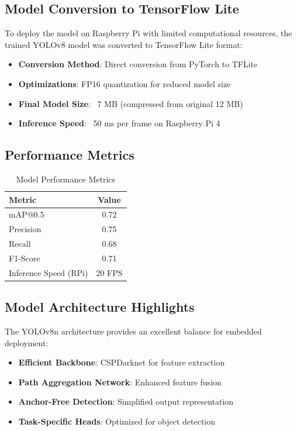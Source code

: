 \documentclass[12pt,a4paper]{article}
\begin{document}
	\subsection{Model Conversion to TensorFlow Lite}
	
	To deploy the model on Raspberry Pi with limited computational resources, the trained YOLOv8 model was converted to TensorFlow Lite format:
	
	\begin{itemize}
		\item \textbf{Conversion Method}: Direct conversion from PyTorch to TFLite
		\item \textbf{Optimizations}: FP16 quantization for reduced model size
		\item \textbf{Final Model Size}: ~7 MB (compressed from original 12 MB)
		\item \textbf{Inference Speed}: ~50 ms per frame on Raspberry Pi 4
	\end{itemize}
	
	\subsection{Performance Metrics}
	
	\begin{table}[H]
		\centering
		\begin{tabular}{|l|c|}
			\hline
			\textbf{Metric} & \textbf{Value} \\
			\hline
			mAP@0.5 & 0.72 \\
			Precision & 0.75 \\
			Recall & 0.68 \\
			F1-Score & 0.71 \\
			Inference Speed (RPi) & 20 FPS \\
			\hline
		\end{tabular}
		\caption{Model Performance Metrics}
	\end{table}
	
	\subsection{Model Architecture Highlights}
	
	The YOLOv8n architecture provides an excellent balance for embedded deployment:
	\begin{itemize}
		\item \textbf{Efficient Backbone}: CSPDarknet for feature extraction
		\item \textbf{Path Aggregation Network}: Enhanced feature fusion
		\item \textbf{Anchor-Free Detection}: Simplified output representation
		\item \textbf{Task-Specific Heads}: Optimized for object detection
	\end{itemize}
	
\end{document}
